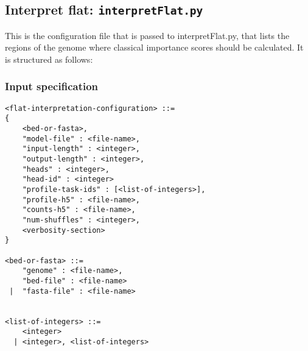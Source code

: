 \documentclass{article}
\begin{document}
\newpage

\subsection{Interpret flat: \texttt{interpretFlat.py}}

This is the configuration file that is passed to interpretFlat.py, that lists the regions of
the genome where classical importance scores should be calculated. It is structured as follows:

\subsubsection{Input specification}

\begin{lstlisting}
<flat-interpretation-configuration> ::=
{
    <bed-or-fasta>,
    "model-file" : <file-name>,
    "input-length" : <integer>,
    "output-length" : <integer>,
    "heads" : <integer>,
    "head-id" : <integer>
    "profile-task-ids" : [<list-of-integers>],
    "profile-h5" : <file-name>,
    "counts-h5" : <file-name>,
    "num-shuffles" : <integer>,
    <verbosity-section>
}

<bed-or-fasta> ::=
    "genome" : <file-name>,
    "bed-file" : <file-name>
 |  "fasta-file" : <file-name>


<list-of-integers> ::=
    <integer>
  | <integer>, <list-of-integers>

\end{lstlisting}
\end{document}
